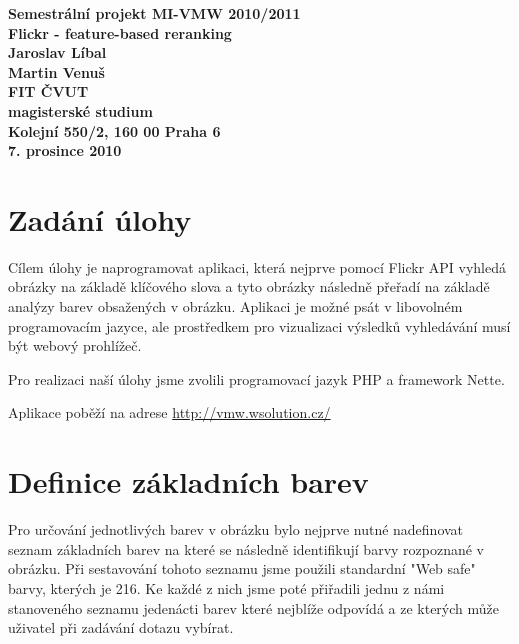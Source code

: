 \documentclass[12pt]{article}
\author{Martin Venuš, Jaroslav Líbal}
\begin{document}

\begin{center}
\bf Semestrální projekt MI-VMW 2010/2011\\[5mm]
    Flickr - feature-based reranking\\[5mm]
       Jaroslav Líbal\\
       Martin Venuš\\[5mm]
FIT ČVUT\\[2mm]
magisterské studium\\[2mm]
Kolejní 550/2, 160 00 Praha 6\\[2mm]
7. prosince 2010
\end{center}

\newpage
\tableofcontents
\newpage
\pagestyle{fancy}

\section{Zadání úlohy}
Cílem úlohy je naprogramovat aplikaci, která nejprve pomocí Flickr API vyhledá obrázky na základě klíčového slova a tyto obrázky následně přeřadí na základě analýzy barev obsažených v obrázku. Aplikaci je možné psát v libovolném programovacím jazyce, ale prostředkem pro vizualizaci výsledků vyhledávání musí být webový prohlížeč.

Pro realizaci naší úlohy jsme zvolili programovací jazyk PHP a framework Nette.

Aplikace poběží na adrese \url{http://vmw.wsolution.cz/}


\section{Definice základních barev}
Pro určování jednotlivých barev v obrázku bylo nejprve nutné nadefinovat seznam základních barev na které se následně identifikují barvy rozpoznané v obrázku. Při sestavování tohoto seznamu jsme použili standardní "Web safe" barvy, kterých je 216. Ke každé z nich jsme poté přiřadili jednu z námi stanoveného seznamu jedenácti barev které nejblíže odpovídá a ze kterých může uživatel při zadávání dotazu vybírat.
\end{document}
